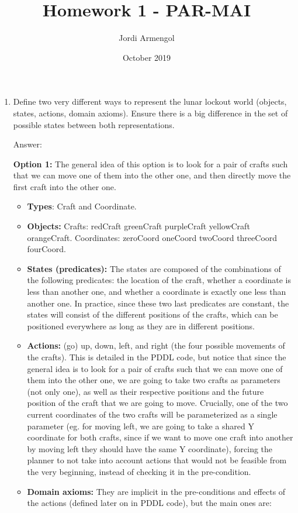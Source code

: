 \documentclass{article}
\title{Homework 1 - PAR-MAI}
\author{Jordi Armengol}
\date{October 2019}
\begin{document}
\maketitle

\begin{enumerate}
    \item 
Define two very different ways to represent the lunar lockout world (objects, states, actions, domain axioms). Ensure there is a big difference in the set of possible states between both representations.

Answer:

\textbf{Option 1:} The general idea of this option is to look for a pair of crafts such that we can move one of them into the other one, and then directly move the first craft into the other one.


\begin{itemize}
    \item \textbf{Types}: Craft and Coordinate.
    \item \textbf{Objects:} Crafts: redCraft greenCraft purpleCraft yellowCraft orangeCraft. Coordinates: zeroCoord oneCoord twoCoord threeCoord fourCoord.
    \item \textbf{States (predicates):} The states are composed of the combinations of the following predicates: the location of the craft, whether a coordinate is less than another one, and whether a coordinate is exactly one less than another one. In practice, since these two last predicates are constant, the states will consist of the different positions of the crafts, which can be positioned everywhere as long as they are in different positions.
    \item \textbf{Actions:} (go) up, down, left, and right (the four possible movements of the crafts). This is detailed in the PDDL code, but notice that since the general idea is to look for a pair of crafts such that we can move one of them into the other one, we are going to take two crafts as parameters (not only one), as well as their respective positions and the future position of the craft that we are going to move. Crucially, one of the two current coordinates of the two crafts will be parameterized as a single parameter (eg. for moving left, we are going to take a shared Y coordinate for both crafts, since if we want to move one craft into another by moving left they should have the same Y coordinate), forcing the planner to not take into account actions that would not be feasible from the very beginning, instead of checking it in the pre-condition.
    \item \textbf{Domain axioms:} They are implicit in the pre-conditions and effects of the actions (defined later on in PDDL code), but the main ones are:

\end{itemize}
\end{enumerate}
\end{document}
